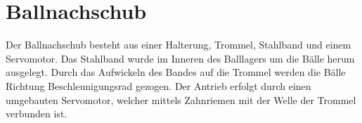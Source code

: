 \section{Ballnachschub}
Der Ballnachschub besteht aus einer Halterung, Trommel, Stahlband und einem 
Servomotor. Das Stahlband wurde im Inneren des Balllagers um die Bälle herum 
ausgelegt. Durch das Aufwickeln des Bandes auf die Trommel werden die Bälle 
Richtung Beschleunigungsrad gezogen. Der Antrieb erfolgt durch einen 
umgebauten Servomotor, welcher mittels Zahnriemen mit der Welle der Trommel 
verbunden ist.
